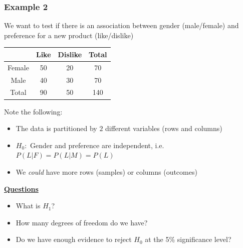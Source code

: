 \documentclass[t,8pt]{beamer}%
\begin{document}
\begin{frame}
	\frametitle{Example 2}
    We want to test if there is an association between gender (male/female) and preference for a new product (like/dislike)
	\begin{center}
		\begin{tabular}{ c | c  c | c }
			& Like & Dislike & Total \\ \hline
			Female & 50 & 20 & 70 \\ %
			Male & 40 & 30 & 70 \\ \hline
			Total & 90 & 50 & 140
		\end{tabular} 
	\end{center}%
	Note the following:
	\begin{itemize}
		\item The data is partitioned by $2$ different variables (rows and columns)
		\item $H_0:$ Gender and preference are independent, i.e. $P(L|F)=P(L|M)=P(L)$
		\item We {\it could} have more rows (samples) or columns (outcomes)
	\end{itemize}
	{\bf\underline{Questions}} \par
	\begin{itemize}
		\item What is $H_1$?
		\item How many degrees of freedom do we have?
        \item Do we have enough evidence to reject $H_0$ at the 5\% significance level?
	\end{itemize}
\end{frame}
\end{document}
